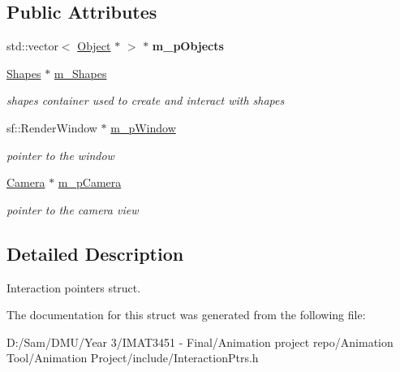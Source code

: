 \subsection*{Public Attributes}
\begin{DoxyCompactItemize}
\item 
\mbox{\label{struct_interaction_ptrs_af227218d0e28a40c406f8406b77d6486}} 
std\+::vector$<$ \hyperlink{class_object}{Object} $\ast$ $>$ $\ast$ {\bfseries m\+\_\+p\+Objects}
\item 
\mbox{\label{struct_interaction_ptrs_ae55ba8e8bd18a67eae5740b76c6b3791}} 
\hyperlink{class_shapes}{Shapes} $\ast$ \hyperlink{struct_interaction_ptrs_ae55ba8e8bd18a67eae5740b76c6b3791}{m\+\_\+\+Shapes}
\begin{DoxyCompactList}\small\item\em shapes container used to create and interact with shapes \end{DoxyCompactList}\item 
\mbox{\label{struct_interaction_ptrs_a9ef141a4721b7420290ed85011eb4e29}} 
sf\+::\+Render\+Window $\ast$ \hyperlink{struct_interaction_ptrs_a9ef141a4721b7420290ed85011eb4e29}{m\+\_\+p\+Window}
\begin{DoxyCompactList}\small\item\em pointer to the window \end{DoxyCompactList}\item 
\mbox{\label{struct_interaction_ptrs_a1c0387f28c3d217ad2b7d30fef015b50}} 
\hyperlink{class_camera}{Camera} $\ast$ \hyperlink{struct_interaction_ptrs_a1c0387f28c3d217ad2b7d30fef015b50}{m\+\_\+p\+Camera}
\begin{DoxyCompactList}\small\item\em pointer to the camera view \end{DoxyCompactList}\end{DoxyCompactItemize}


\subsection{Detailed Description}
Interaction pointers struct. 

The documentation for this struct was generated from the following file\+:\begin{DoxyCompactItemize}
\item 
D\+:/\+Sam/\+D\+M\+U/\+Year 3/\+I\+M\+A\+T3451 -\/ Final/\+Animation project repo/\+Animation Tool/\+Animation Project/include/Interaction\+Ptrs.\+h\end{DoxyCompactItemize}
